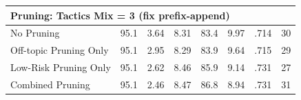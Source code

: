\begin{table}[t!]
\begin{tabular}{lrrrrrrr}
\midrule
\multicolumn{6}{l}{\textbf{Pruning}: Tactics Mix = 3 (fix prefix-append)} \\
\midrule
        
No Pruning              & 95.1 & 3.64 & 8.31 & 83.4 & 9.97 & .714 & 30 \\
Off-topic Pruning Only & 95.1 & 2.95 & 8.29 & 83.9 & 9.64 & .715 & 29 \\
Low-Risk Pruning Only   & 95.1 & 2.62 & 8.46 & 85.9 & 9.14 & .731 & 27 \\
\rowcolor{columbiablue} Combined Pruning        & 95.1 & 2.46 & 8.47 & 86.8 & 8.94 & .731 & 31 \\

        \bottomrule
    \end{tabular}
\end{table}



